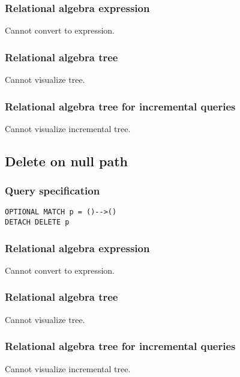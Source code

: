 \subsubsection*{Relational algebra expression}

Cannot convert to expression.

\subsubsection*{Relational algebra tree}

Cannot visualize tree.

\subsubsection*{Relational algebra tree for incremental queries}

Cannot visualize incremental tree.

\subsection{Delete on null path}

\subsubsection*{Query specification}

\begin{lstlisting}
OPTIONAL MATCH p = ()-->()
DETACH DELETE p
\end{lstlisting}

\subsubsection*{Relational algebra expression}

Cannot convert to expression.

\subsubsection*{Relational algebra tree}

Cannot visualize tree.

\subsubsection*{Relational algebra tree for incremental queries}

Cannot visualize incremental tree.

